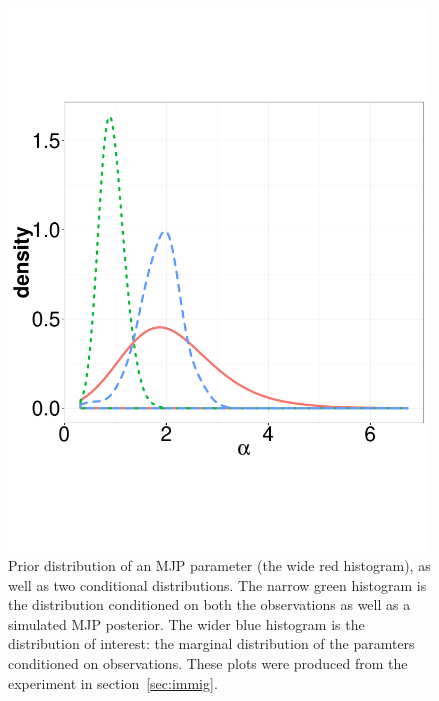   \begin{figure}%
  \centering
  \begin{minipage}[hp]{0.44\linewidth}
  \centering
    \includegraphics [width=0.99\textwidth, angle=0]{figs/hist_alpha.pdf}
    \vspace{-0 in}
  \end{minipage}
  \begin{minipage}[hp]{0.55\linewidth}
    \vspace{-0.8 in}
  \caption{Prior distribution of an MJP parameter (the wide red histogram),
  as well as two conditional distributions. The narrow green histogram is the
distribution conditioned on both the observations as well as a simulated
MJP posterior. The wider blue histogram is the distribution of interest: the
marginal distribution of the paramters conditioned on observations. These
plots were produced from the experiment in section~\ref{sec:immig}.}
     \label{fig:hist}
  \end{minipage}
  \end{figure}

